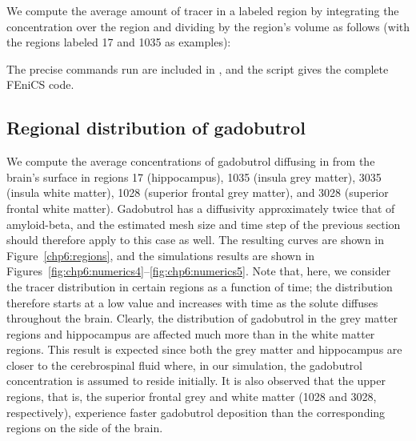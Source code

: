 \noindent We compute the average amount of tracer in a labeled region by
integrating the concentration over the region and dividing by the
region's volume as follows (with the regions labeled 17 and 1035 as
examples):

\noindent The precise commands run are included in
, and the script
 gives the complete
FEniCS code.

\subsection{Regional distribution of gadobutrol}
We compute the average concentrations of gadobutrol diffusing in from
the brain's surface in regions 17 (hippocampus), 1035 (insula grey
matter), 3035 (insula white matter), 1028 (superior frontal grey
matter), and 3028 (superior frontal white matter).  Gadobutrol has a
diffusivity approximately twice that of amyloid-beta, and the
estimated mesh size and time step of the previous section should therefore apply
to this case as well.  The resulting curves are shown in
Figure~\ref{chp6:regions}, and the simulations results are shown in
Figures~\ref{fig:chp6:numerics4}--\ref{fig:chp6:numerics5}. Note that, here, 
we consider the tracer distribution in certain regions as a
function of time; the distribution therefore starts at a low value and increases 
with time as the solute diffuses throughout the brain. Clearly, the
distribution of gadobutrol in the grey matter regions and hippocampus
are affected much more than in the white matter regions. This result is
expected since both the grey matter and hippocampus are
closer to the cerebrospinal fluid where, in our simulation, the gadobutrol
concentration is assumed to reside initially.  It is also observed
that the upper regions, that is, the superior frontal grey and white matter
(1028 and 3028, respectively), experience faster gadobutrol deposition
than the corresponding regions on the side of the brain.
